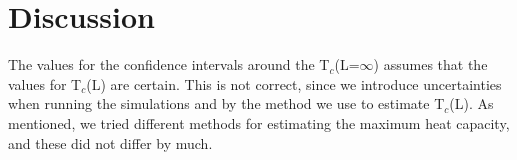\section{Discussion}

The values for the confidence intervals around the T$_c$(L=$\infty$)
assumes that the values for T$_c$(L) are certain. This is not correct, since
we introduce uncertainties when running the simulations and by the method we use
to estimate T$_c$(L). As mentioned, we tried different methods for estimating
the maximum heat capacity, and these did not differ by much.
